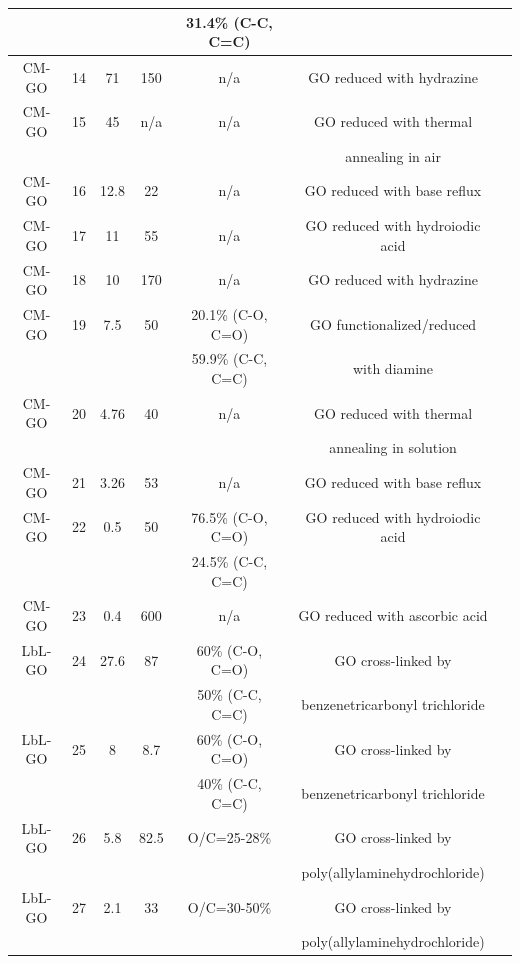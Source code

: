 \begin{table}
\begin{center}
\begin{tabular}{*7c}
         &  &  &  & 31.4\% (C-C, C=C) &  & \\
        \hline
        CM-GO & 14 & 71 & 150 & n/a & GO reduced with hydrazine & \cite{akbari2016large}\\
        CM-GO & 15 & 45 &  n/a & n/a & GO reduced with thermal & \cite{qiu2011controllable}\\
         & & &  &  & annealing in air & \\
        CM-GO & 16 & 12.8 &  22 & n/a & GO reduced with base reflux & \cite{han2013ultrathin}\\
        CM-GO & 17 & 11 &  55 & n/a & GO reduced with hydroiodic acid & \cite{goh2015all}\\
        CM-GO & 18 & 10 &  170 & n/a & GO reduced with hydrazine & \\
        CM-GO & 19 & 7.5 &  50 & 20.1\% (C-O, C=O) & GO functionalized/reduced & \cite{xia2015ultrathin}\\
         & &  &  & 59.9\% (C-C, C=C) & with diamine & \\
        CM-GO & 20 & 4.76 &  40 & n/a &  GO reduced with thermal & \cite{han2015high}\\
        & & &  &  & annealing in solution & \\
        CM-GO & 21 & 3.26 & 53 & n/a &  GO reduced with base reflux  & \cite{han2013ultrathin}\\
        CM-GO & 22 & 0.5 & 50 & 76.5\% (C-O, C=O) &  GO reduced with hydroiodic acid  & \cite{amadei2017role}\\
        & &  &  & 24.5\% (C-C, C=C) &  & \\
        CM-GO & 23 & 0.4 & 600 & n/a &  GO reduced with ascorbic acid  & \cite{chen2016reduced}\\
        \hline
        LbL-GO & 24 & 27.6 & 87 & 60\% (C-O, C=O) &  GO cross-linked by  & \cite{Hu2013}\\
        & &  &  & 50\% (C-C, C=C) & benzenetricarbonyl trichloride & \\
        LbL-GO & 25 & 8 & 8.7 & 60\% (C-O, C=O) &  GO cross-linked by  & \cite{Hu2013}\\
        & &  &  & 40\% (C-C, C=C) & benzenetricarbonyl trichloride & \\
        LbL-GO & 26 & 5.8 & 82.5 & O/C=25-28\% &  GO cross-linked by  & \cite{hu2014layer}\\
        & &  &  &  & poly(allylaminehydrochloride)& \\
        LbL-GO & 27 & 2.1 & 33 & O/C=30-50\% &  GO cross-linked by  & \cite{hu2014layer}\\
        & &  &  &  & poly(allylaminehydrochloride)& \\
        \end{tabular}
    \end{center}
\end{table}

